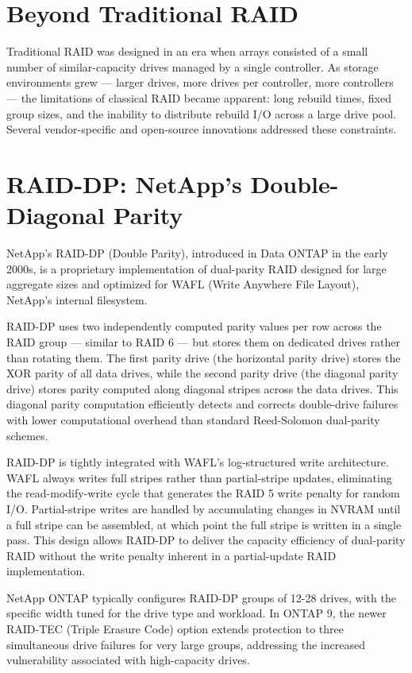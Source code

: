 \section{Beyond Traditional RAID}
Traditional RAID was designed in an era when arrays consisted of a small number of similar-capacity drives managed by a single controller. As storage environments grew --- larger drives, more drives per controller, more controllers --- the limitations of classical RAID became apparent: long rebuild times, fixed group sizes, and the inability to distribute rebuild I/O across a large drive pool. Several vendor-specific and open-source innovations addressed these constraints.

\section{RAID-DP: NetApp's Double-Diagonal Parity}
NetApp's RAID-DP (Double Parity), introduced in Data ONTAP in the early 2000s, is a proprietary implementation of dual-parity RAID designed for large aggregate sizes and optimized for WAFL (Write Anywhere File Layout), NetApp's internal filesystem.

RAID-DP uses two independently computed parity values per row across the RAID group --- similar to RAID 6 --- but stores them on dedicated drives rather than rotating them. The first parity drive (the horizontal parity drive) stores the XOR parity of all data drives, while the second parity drive (the diagonal parity drive) stores parity computed along diagonal stripes across the data drives. This diagonal parity computation efficiently detects and corrects double-drive failures with lower computational overhead than standard Reed-Solomon dual-parity schemes.

RAID-DP is tightly integrated with WAFL's log-structured write architecture. WAFL always writes full stripes rather than partial-stripe updates, eliminating the read-modify-write cycle that generates the RAID 5 write penalty for random I/O. Partial-stripe writes are handled by accumulating changes in NVRAM until a full stripe can be assembled, at which point the full stripe is written in a single pass. This design allows RAID-DP to deliver the capacity efficiency of dual-parity RAID without the write penalty inherent in a partial-update RAID implementation.

NetApp ONTAP typically configures RAID-DP groups of 12-28 drives, with the specific width tuned for the drive type and workload. In ONTAP 9, the newer RAID-TEC (Triple Erasure Code) option extends protection to three simultaneous drive failures for very large groups, addressing the increased vulnerability associated with high-capacity drives.

